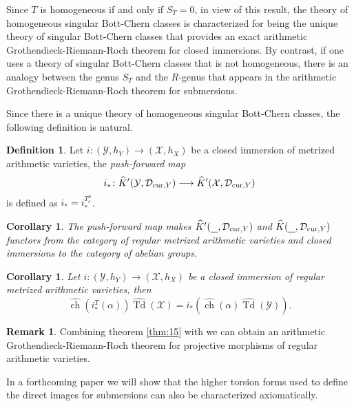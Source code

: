 \documentclass[10pt,twoside]{article}
\numberwithin{equation}{section}
\theoremstyle{plain}
\newtheorem{corollary}[equation]{Corollary}
\theoremstyle{definition}
\newtheorem{definition}[equation]{Definition}
\newtheorem{remark}[equation]{Remark}
\DeclareMathOperator{\Td}{Td}
\DeclareMathOperator{\ch}{ch}
\newcommand{\D}{\text{{\rm cur}}}
\begin{document}
Since $T$ is homogeneous if and only if $S_{T}=0$,
in view of this result, 
  the theory of homogeneous singular Bott-Chern classes is characterized
  for being the unique theory of singular Bott-Chern classes that
  provides an exact arithmetic Grothendieck-Riemann-Roch theorem for
  closed immersions. 
  By contrast, if one uses a theory of singular Bott-Chern
  classes that is not homogeneous, there is an analogy between the genus
  $S_{T}$ and the $R$-genus that appears in the arithmetic
  Grothendieck-Riemann-Roch theorem for submersions.

Since there is a unique theory of homogeneous singular Bott-Chern
classes, the following definition is natural. 

\begin{definition}
    Let $i\colon (\mathcal{Y},h_{Y})\longrightarrow
(\mathcal{X},h_{X})$ be a closed immersion of metrized arithmetic
varieties, the 
\emph{push-forward map}
\begin{displaymath}
  i_{\ast}\colon \widehat
  K'(\mathcal{Y},\mathcal{D}_{\D,Y})\longrightarrow  
  \widehat K'(\mathcal{X},\mathcal{D}_{\D,Y})
\end{displaymath}
is defined as $i_{\ast}=i^{T_{c}^{h}}_{\ast}$.
\end{definition}

\begin{corollary}
  The push-forward map makes
  $\widehat{K}'(\underline{\phantom{\mathcal{Y}}},\mathcal{D}_{\D,Y})$
  and 
  $\widehat{K}(\underline{\phantom{\mathcal{Y}}},\mathcal{D}_{\D,Y})$
  functors from the category of  regular metrized arithmetic varieties and
  closed immersions to the category of  abelian groups.
\end{corollary}

\begin{corollary}
      Let $i\colon (\mathcal{Y},h_{Y})\longrightarrow
(\mathcal{X},h_{X})$ be a closed immersion of regular metrized arithmetic
varieties, then 
  \begin{equation}\label{eq:89}
    \widehat {\ch}(i^{T}_{\ast}(\alpha ))\widehat {\Td}(\mathcal{X})= 
    i_{\ast}(\widehat{\ch}(\alpha
    )\widehat{\Td}(\mathcal{Y})). 
  \end{equation}  
\end{corollary}

\begin{remark}
  Combining theorem \ref{thm:15} with
  \cite{GilletRoesslerSoule:_arith_rieman_roch_theor_in_higher_degrees}
  we can obtain an arithmetic Grothendieck-Riemann-Roch theorem for
  projective morphisms of regular arithmetic varieties. 

  In a forthcoming paper we will show that the higher torsion forms used to
  define the direct images for submersions can also be characterized
  axiomatically.  
\end{remark}
\end{document}

